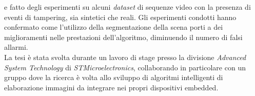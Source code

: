 e fatto degli esperimenti su alcuni \textit{dataset} di sequenze video con la presenza di eventi di tampering, sia sintetici che reali.
Gli esperimenti condotti hanno confermato come l'utilizzo della segmentazione della scena porti a dei miglioramenti nelle prestazioni dell'algoritmo, diminuendo il numero di falsi allarmi.\\
La tesi \`e stata svolta durante un lavoro di stage presso la divisione \textit{Advanced System Technology} di \textit{STMicroelectronics}, collaborando in particolare con un gruppo dove la ricerca \`e volta allo sviluppo di algoritmi intelligenti di elaborazione immagini da integrare nei propri dispositivi embedded.\\
